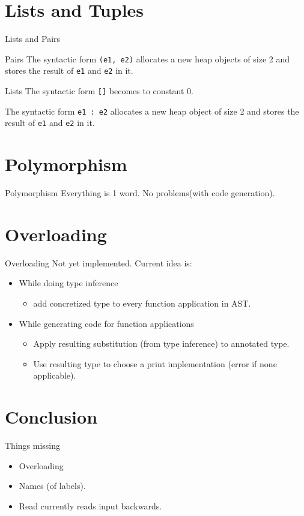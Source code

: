\documentclass{beamer}
\begin{document}
\section{Lists and Tuples}

\begin{frame}{Lists and Pairs}
\begin{block}{Pairs}
The syntactic form \lstinline{(e1, e2)} allocates a new heap objects of
size 2 and stores the result of \lstinline{e1} and \lstinline{e2} in it.
\end{block}
\begin{block}{Lists}
The syntactic form \lstinline{[]} becomes to constant 0.

The syntactic form \lstinline{e1 : e2} allocates a new heap object of 
size 2 and stores the result of \lstinline{e1} and \lstinline{e2} in it.
\end{block}
\end{frame}

\section{Polymorphism}
\begin{frame}{Polymorphism}
Everything is 1 word. No problems(with code generation).
\end{frame}
\section{Overloading}

\begin{frame}{Overloading}
Not yet implemented. Current idea is:
\begin{itemize}
\item While doing type inference
 \begin{itemize}
 \item add concretized type to every function application in AST.
 \end{itemize}
\item While generating code for function applications
 \begin{itemize}
 \item Apply resulting substitution (from type inference) to annotated type.
 \item Use resulting type to choose a print implementation (error if none applicable).
 \end{itemize}
\end{itemize}
\end{frame}

\section{Conclusion}

\begin{frame}{Things missing}
\begin{itemize}
\item Overloading
\item Names (of labels).
\item Read currently reads input backwards.
\end{itemize}
\end{frame}
\end{document}
